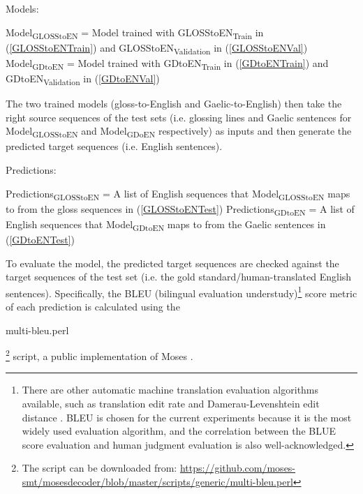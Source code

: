 \documentclass[final]{ua-thesis}
\numberwithin{equation}{section}
\begin{document}
\begin{exe}
\ex Models:
	\begin{xlist}
	\ex \label{ModelGlossToEN} Model\textsubscript{GLOSStoEN} = Model trained with GLOSStoEN\textsubscript{Train} in (\ref{GLOSStoENTrain}) and GLOSStoEN\textsubscript{Validation} in (\ref{GLOSStoENVal})
	\ex \label{ModelGDToEN}Model\textsubscript{GDtoEN} = Model trained with GDtoEN\textsubscript{Train} in (\ref{GDtoENTrain}) and GDtoEN\textsubscript{Validation} in (\ref{GDtoENVal})
	\end{xlist}	
\end{exe}
The two trained models (gloss-to-English and Gaelic-to-English) then take the right source sequences of the test sets (i.e. glossing lines and Gaelic sentences for Model\textsubscript{GLOSStoEN} and Model\textsubscript{GDoEN} respectively) as inputs and then generate the predicted target sequences (i.e. English sentences).

\begin{exe}
\ex Predictions:
	\begin{xlist}
	\ex Predictions\textsubscript{GLOSStoEN} = A list of English sequences that Model\textsubscript{GLOSStoEN} maps to from the gloss sequences in (\ref{GLOSStoENTest})
	\ex Predictions\textsubscript{GDtoEN} = A list of English sequences that Model\textsubscript{GDtoEN} maps to from the Gaelic sentences in (\ref{GDtoENTest})
	\end{xlist}	
\end{exe}

To evaluate the model, the predicted target sequences are checked against the target sequences of the test set (i.e. the gold standard/human-translated English sentences).
Specifically, the BLEU (bilingual evaluation understudy)\footnote{There are other automatic machine translation evaluation algorithms available, such as translation edit rate \citep{Snover06astudy} and Damerau-Levenshtein edit distance \citep{damerau1964technique, levenshtein1966binary}. BLEU is chosen for the current experiments because it is the most widely used evaluation algorithm, and the correlation between the BLUE score evaluation and human judgment evaluation is also well-acknowledged.} score metric \citep{bleu} of each prediction is calculated using the \begin{myfont}multi-bleu.perl\end{myfont}\footnote{The script can be downloaded from: \url{https://github.com/moses-smt/mosesdecoder/blob/master/scripts/generic/multi-bleu.perl}}
script, a public implementation of Moses \citep{moses}. 
\end{document}
